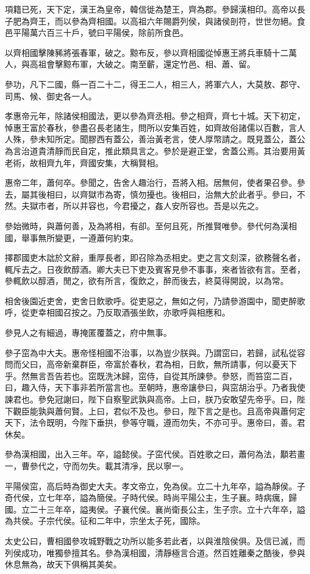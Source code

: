 項籍已死，天下定，漢王為皇帝，韓信徙為楚王，齊為郡。參歸漢相印。高帝以長子肥為齊王，而以參為齊相國。以高祖六年賜爵列侯，與諸侯剖符，世世勿絕。食邑平陽萬六百三十戶，號曰平陽侯，除前所食邑。

以齊相國擊陳豨將張春軍，破之。黥布反，參以齊相國從悼惠王將兵車騎十二萬人，與高祖會擊黥布軍，大破之。南至蘄，還定竹邑、相、蕭、留。

參功，凡下二國，縣一百二十二，得王二人，相三人，將軍六人，大莫敖、郡守、司馬、候、御史各一人。

孝惠帝元年，除諸侯相國法，更以參為齊丞相。參之相齊，齊七十城。天下初定，悼惠王富於春秋，參盡召長老諸生，問所以安集百姓，如齊故俗諸儒以百數，言人人殊，參未知所定。聞膠西有蓋公，善治黃老言，使人厚幣請之。既見蓋公，蓋公為言治道貴清靜而民自定，推此類具言之。參於是避正堂，舍蓋公焉。其治要用黃老術，故相齊九年，齊國安集，大稱賢相。

惠帝二年，蕭何卒。參聞之，告舍人趣治行，吾將入相。居無何，使者果召參。參去，屬其後相曰，以齊獄市為寄，慎勿擾也。後相曰，治無大於此者乎。參曰，不然。夫獄市者，所以并容也，今君擾之，姦人安所容也。吾是以先之。

參始微時，與蕭何善，及為將相，有卻。至何且死，所推賢唯參。參代何為漢相國，舉事無所變更，一遵蕭何約束。

擇郡國吏木詘於文辭，重厚長者，即召除為丞相史。吏之言文刻深，欲務聲名者，輒斥去之。日夜飲醇酒。卿大夫已下吏及賓客見參不事事，來者皆欲有言。至者，參輒飲以醇酒，閒之，欲有所言，復飲之，醉而後去，終莫得開說，以為常。

相舍後園近吏舍，吏舍日飲歌呼。從吏惡之，無如之何，乃請參游園中，聞吏醉歌呼，從吏幸相國召按之。乃反取酒張坐飲，亦歌呼與相應和。

參見人之有細過，專掩匿覆蓋之，府中無事。

參子窋為中大夫。惠帝怪相國不治事，以為豈少朕與。乃謂窋曰，若歸，試私從容問而父曰，高帝新棄群臣，帝富於春秋，君為相，日飲，無所請事，何以憂天下乎。然無言吾告若也。窋既洗沐歸，窋侍，自從其所諫參。參怒，而笞窋二百，曰，趣入侍，天下事非若所當言也。至朝時，惠帝讓參曰，與窋胡治乎。乃者我使諫君也。參免冠謝曰，陛下自察聖武孰與高帝。上曰，朕乃安敢望先帝乎。曰，陛下觀臣能孰與蕭何賢。上曰，君似不及也。參曰，陛下言之是也。且高帝與蕭何定天下，法令既明，今陛下垂拱，參等守職，遵而勿失，不亦可乎。惠帝曰，善。君休矣。

參為漢相國，出入三年。卒，謚懿侯。子窋代侯。百姓歌之曰，蕭何為法，顜若畫一，曹參代之，守而勿失。載其清凈，民以寧一。

平陽侯窋，高后時為御史大夫。孝文帝立，免為侯。立二十九年卒，謚為靜侯。子奇代侯，立七年卒，謚為簡侯。子時代侯。時尚平陽公主，生子襄。時病癘，歸國。立二十三年卒，謚夷侯。子襄代侯。襄尚衛長公主，生子宗。立十六年卒，謚為共侯。子宗代侯。征和二年中，宗坐太子死，國除。

太史公曰，曹相國參攻城野戰之功所以能多若此者，以與淮陰侯俱。及信已滅，而列侯成功，唯獨參擅其名。參為漢相國，清靜極言合道。然百姓離秦之酷後，參與休息無為，故天下俱稱其美矣。